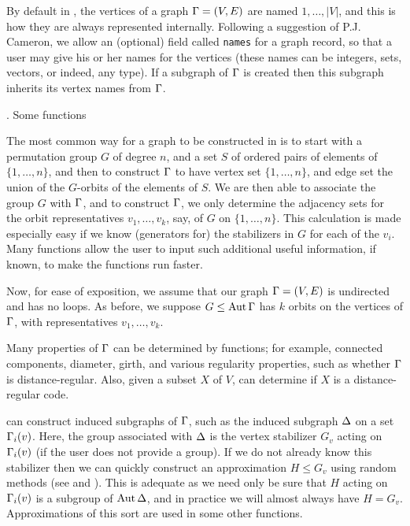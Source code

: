 By default in {\GRAPE}, the vertices of a graph $\Gamma=(V,E)$ are 
named $1,\ldots,|V|$, and this is how they are always 
represented internally. Following a suggestion of P.J. Cameron,
we allow an (optional) field called {\tt names} for a graph record, so  
that a user may give his or her names for the vertices
(these names can be integers, sets, vectors, or indeed, any {\GAP} 
type). If a subgraph of $\Gamma$ is created then this subgraph inherits
its vertex names from $\Gamma$.

. Some {\GRAPE} functions                %
\endhead                             %

The most common way for a graph to be constructed in {\GRAPE}
is to start with a permutation group $G$ of degree $n$, and 
a set $S$ of ordered pairs of elements of $\{1,\ldots,n\}$, and then
to construct $\Gamma$ to have vertex set $\{1,\ldots,n\}$, and edge 
set the union of the $G$-orbits of the elements of $S$.
We are then able to associate the group $G$ with $\Gamma$, and 
to construct $\Gamma$, we only determine the adjacency sets for the 
orbit representatives $v_1,\ldots,v_k$, say, of $G$ on $\{1,\ldots,n\}$. 
This calculation is made especially easy if we know (generators for)
the stabilizers in $G$ for each of the $v_i$.
Many {\GRAPE} functions allow the user to input such additional 
useful information, if known,  to make the functions run faster. 

Now, for ease of exposition, we assume that our graph
$\Gamma=(V,E)$ is undirected and has no loops. As before,
we suppose $G\le\hbox{\rm Aut\,}\Gamma$ has $k$ orbits on the vertices
of $\Gamma$, with representatives $v_1,\ldots,v_k$.

Many properties of $\Gamma$ can be determined by {\GRAPE} functions;
for example, connected components, diameter, girth, and various regularity
properties, such as whether $\Gamma$ is distance-regular.
Also, given a subset $X$ of $V$, {\GRAPE} can determine if
$X$ is a distance-regular code.

{\GRAPE} can construct induced subgraphs of $\Gamma$, such as the 
induced subgraph $\Delta$ on a set $\Gamma_i(v)$. 
Here, the group associated with $\Delta$ is the vertex stabilizer $G_v$ 
acting on $\Gamma_i(v)$ (if the user does not provide a group).
If we do not already know this stabilizer then we can quickly construct an 
approximation $H\le G_v$ using random methods (see \cite{1} and \cite{7}). 
This is adequate as we need only be sure that $H$ acting on 
$\Gamma_i(v)$ is a subgroup of $\hbox{\rm Aut\,}\Delta$, and
in practice we will almost always have $H=G_v$.
Approximations of this sort are used in some other {\GRAPE} functions.
    
